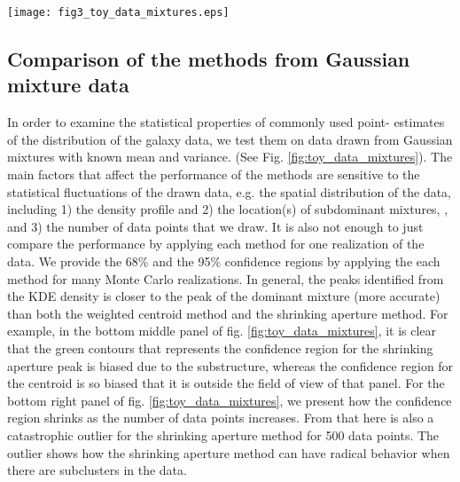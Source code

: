 \begin{figure*}
	\texttt{[image: fig3\_toy\_data\_mixtures.eps]}
	\caption{Comparison of peak finding performances of different methods by
		drawing data points (i.e. 20, 50, 100, 500) from known number of 
		Gaussian mixtures. 
		Panels from the top row contain data drawn from a single Gaussian mixture. The
		panels from the middle row contain data from two 
		 Gaussian mixtures with weight ratio = 7:3. 
	The panels from the bottom row contain data drawn from three Gaussian
	mixtures with weight ratio = 55:35:10. 
	The left column shows how 50 data points drawn from the fixed number of 
	Gaussian mixtures look like. 
	Due to the statistical nature of this exercise, we sampled the data and
	performed the analyses [TODO: state how many times] many times to
	create the 68\% and 95\% Monte Carlo confidence contours of the estimates in the
	zoomed-in view of the data in the middle
	column. The rightmost column shows how the size (median contour radius) 
	of the confidence regions vary as a
	function of the number of drawn data points from the Gaussian mixtures. 
	From the middle and the rightmost
	column, we can tell that the KDE peak estimate is the most accurate. [TODO] 
		\label{fig:toy_data_mixtures}}
\end{figure*}



\subsection{Comparison of the methods from Gaussian mixture data}
In order to examine the statistical properties of commonly used point-
estimates of the distribution of the galaxy data, we test them on data drawn 
from Gaussian mixtures with known mean and variance. (See Fig.
\ref{fig:toy_data_mixtures}). The main factors that affect the performance of 
the methods are sensitive to the statistical fluctuations of the drawn data, 
e.g. the
spatial distribution of the data, including 1) the density profile and 2) the
location(s) of subdominant mixtures,
, and 3) the number of data points that we draw.
It is also not enough to just
compare the performance by applying each method for one realization of the
data. We provide the 68\% and the 95\% confidence regions by applying the
each method for many Monte Carlo realizations.
In general, the peaks identified from the KDE density is closer to the 
peak of the dominant mixture (more accurate) than 
both the weighted centroid method and the shrinking aperture method.
For example, in the bottom middle panel of fig. \ref{fig:toy_data_mixtures}, 
it is clear that the green contours
that represents the confidence region for the shrinking aperture peak is
biased due to the substructure, whereas the confidence region for the centroid 
is so biased that it is outside the field of view of that panel.
For the bottom right panel of fig. \ref{fig:toy_data_mixtures}, 
we present how the confidence region shrinks as the
number of data points increases.
From that here is also a catastrophic outlier for the shrinking 
aperture method for 500 data
points. The outlier shows how the shrinking aperture method can have
radical behavior when there are subclusters in the data.	

